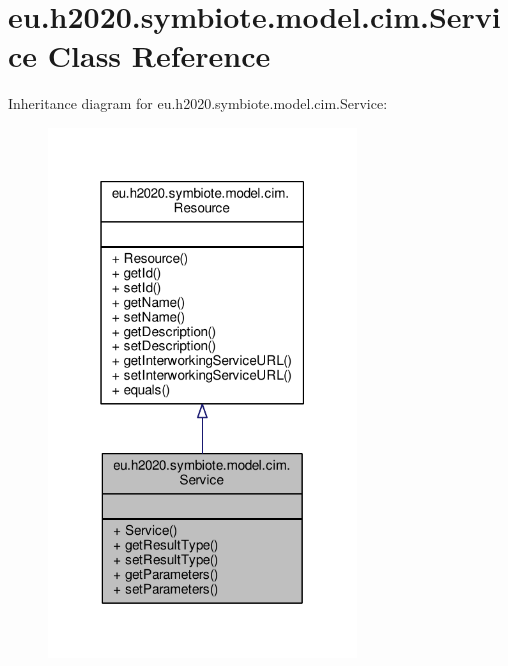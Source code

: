 \hypertarget{classeu_1_1h2020_1_1symbiote_1_1model_1_1cim_1_1Service}{}\section{eu.\+h2020.\+symbiote.\+model.\+cim.\+Service Class Reference}
\label{classeu_1_1h2020_1_1symbiote_1_1model_1_1cim_1_1Service}


Inheritance diagram for eu.\+h2020.\+symbiote.\+model.\+cim.\+Service\+:\nopagebreak
\begin{figure}[H]
\begin{center}
\leavevmode
\includegraphics[width=232pt]{classeu_1_1h2020_1_1symbiote_1_1model_1_1cim_1_1Service__inherit__graph}
\end{center}
\end{figure}


